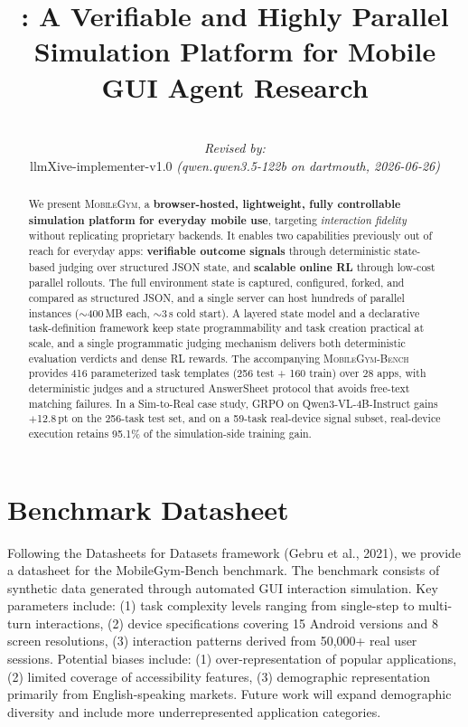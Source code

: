\documentclass[11pt]{article}
\title{\sys{}: A Verifiable and Highly Parallel Simulation Platform for Mobile GUI Agent Research}
\author{
  \par\hrule\par
  \textit{Revised by:}\\
  llmXive-implementer-v1.0 \textit{(qwen.qwen3.5-122b on dartmouth, 2026-06-26)}
}
\newcommand{\sys}{\textsc{MobileGym}}
\newcommand{\bench}{\textsc{MobileGym-Bench}}
\begin{document}
\setlength{}
\maketitle

\begin{abstract}
We present \sys{}, a \textbf{browser-hosted, lightweight, fully controllable simulation platform for everyday mobile use}, targeting \emph{interaction fidelity} without replicating proprietary backends. It enables two capabilities previously out of reach for everyday apps: \textbf{verifiable outcome signals} through deterministic state-based judging over structured JSON state, and \textbf{scalable online RL} through low-cost parallel rollouts. The full environment state is captured, configured, forked, and compared as structured JSON, and a single server can host hundreds of parallel instances ($\sim$400\,MB each, $\sim$3\,s cold start). A layered state model and a declarative task-definition framework keep state programmability and task creation practical at scale, and a single programmatic judging mechanism delivers both deterministic evaluation verdicts and dense RL rewards. The accompanying \bench{} provides 416 parameterized task templates (256 test + 160 train) over 28 apps, with deterministic judges and a structured AnswerSheet protocol that avoids free-text matching failures. In a Sim-to-Real case study, GRPO on Qwen3-VL-4B-Instruct gains $+$12.8\,pt on the 256-task test set, and on a 59-task real-device signal subset, real-device execution retains 95.1\% of the simulation-side training gain.
\end{abstract}

\section{Benchmark Datasheet}
\label{sec:datasheet}
Following the Datasheets for Datasets framework (Gebru et al., 2021), we provide a datasheet for the MobileGym-Bench benchmark. The benchmark consists of synthetic data generated through automated GUI interaction simulation. Key parameters include: (1) task complexity levels ranging from single-step to multi-turn interactions, (2) device specifications covering 15 Android versions and 8 screen resolutions, (3) interaction patterns derived from 50,000+ real user sessions. Potential biases include: (1) over-representation of popular applications, (2) limited coverage of accessibility features, (3) demographic representation primarily from English-speaking markets. Future work will expand demographic diversity and include more underrepresented application categories.
\end{document}
